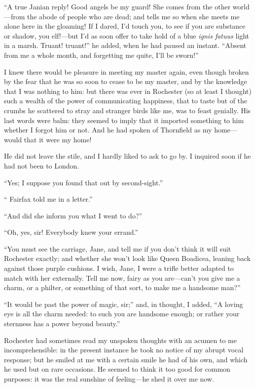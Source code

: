 \enquote{A true Janian reply! Good angels be my guard! She comes from the
	other world---from the abode of people who are dead; and tells me so
	when she meets me alone here in the gloaming! If I dared, I'd touch
	you, to see if you are substance or shadow, you elf!---but I'd as soon
	offer to take hold of a blue \emph{ignis fatuus} light in a marsh.
	Truant! truant!} he added, when he had paused an instant.
\enquote{Absent from me a whole month, and forgetting me quite, I'll be
	sworn!}

I knew there would be pleasure in meeting my master again, even though
broken by the fear that he was so soon to cease to be my master, and by
the knowledge that I was nothing to him: but there was ever in \Mr{}
Rochester (so at least I thought) such a wealth of the power of
communicating happiness, that to taste but of the crumbs he scattered to
stray and stranger birds like me, was to feast genially. His last words
were balm: they seemed to imply that it imported something to him
whether I forgot him or not. And he had spoken of Thornfield as my
home---would that it were my home!

He did not leave the stile, and I hardly liked to ask to go by. I
inquired soon if he had not been to London.

\enquote{Yes; I suppose you found that out by second-sight.}

\enquote{\Mrs{} Fairfax told me in a letter.}

\enquote{And did she inform you what I went to do?}

\enquote{Oh, yes, sir! Everybody knew your errand.}

\enquote{You must see the carriage, Jane, and tell me if you don't think
	it will suit \Mrs{} Rochester exactly; and whether she won't look like
	Queen Boadicea, leaning back against those purple cushions. I wish,
	Jane, I were a trifle better adapted to match with her externally. Tell
	me now, fairy as you are---can't you give me a charm, or a philter, or
	something of that sort, to make me a handsome man?}

\enquote{It would be past the power of magic, sir;} and, in thought, I
added, \enquote{A loving eye is all the charm needed: to such you are
	handsome enough; or rather your sternness has a power beyond beauty.}

\Mr{} Rochester had sometimes read my unspoken thoughts with an acumen to
me incomprehensible: in the present instance he took no notice of my
abrupt vocal response; but he smiled at me with a certain smile he had
of his own, and which he used but on rare occasions. He seemed to think
it too good for common purposes: it was the real sunshine of
feeling---he shed it over me now.

